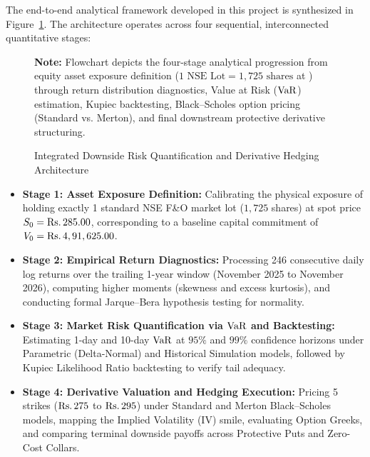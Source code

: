 The end-to-end analytical framework developed in this project is synthesized in Figure~\ref{fig:tikz_architecture}. The architecture operates across four sequential, interconnected quantitative stages:

\begin{figure}[htbp]
\centering
\caption{Integrated Downside Risk Quantification and Derivative Hedging Architecture}
\label{fig:tikz_architecture}
\vspace{4pt}
\resizebox{0.98\linewidth}{!}{
    
}
\vspace{4pt}
\begin{minipage}{0.96\linewidth}
\footnotesize\textbf{Note:} Flowchart depicts the four-stage analytical progression from equity asset exposure definition ($1\text{ NSE Lot} = 1,725\text{ shares}$ at ) through return distribution diagnostics, Value at Risk ($\operatorname{VaR}$) estimation, Kupiec backtesting, Black--Scholes option pricing (Standard vs. Merton), and final downstream protective derivative structuring.
\end{minipage}
\end{figure}

\begin{itemize}
    \item \textbf{Stage 1: Asset Exposure Definition:} Calibrating the physical exposure of holding exactly 1 standard NSE F\&O market lot ($1,725$ shares) at spot price $S_0 = \text{\text{Rs.}\,}285.00$, corresponding to a baseline capital commitment of $V_0 = \text{\text{Rs.}\,}4,91,625.00$.
    \item \textbf{Stage 2: Empirical Return Diagnostics:} Processing 246 consecutive daily log returns over the trailing 1-year window (November 2025 to November 2026), computing higher moments (skewness and excess kurtosis), and conducting formal Jarque--Bera hypothesis testing for normality.
    \item \textbf{Stage 3: Market Risk Quantification via $\operatorname{VaR}$ and Backtesting:} Estimating 1-day and 10-day $\operatorname{VaR}$ at $95\%$ and $99\%$ confidence horizons under Parametric (Delta-Normal) and Historical Simulation models, followed by Kupiec Likelihood Ratio backtesting to verify tail adequacy.
    \item \textbf{Stage 4: Derivative Valuation and Hedging Execution:} Pricing 5 strikes ($\text{\text{Rs.}\,}275$ to $\text{\text{Rs.}\,}295$) under Standard and Merton Black--Scholes models, mapping the Implied Volatility (IV) smile, evaluating Option Greeks, and comparing terminal downside payoffs across Protective Puts and Zero-Cost Collars.
\end{itemize}
